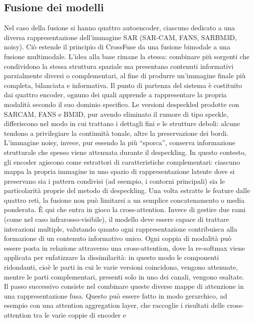 \subsection{Fusione dei modelli}
Nel caso della fusione si hanno quattro autoencoder, ciascuno dedicato a una diversa rappresentazione dell’immagine SAR (SAR-CAM, FANS, SARBM3D, noisy).
Ciò estende il principio di CrossFuse da una fusione bimodale a una 
fusione multimodale. L’idea alla base rimane la stessa: combinare più sorgenti che condividono la stessa struttura spaziale ma presentano contenuti 
informativi parzialmente diversi o complementari, al fine di produrre un’immagine finale più completa, bilanciata e informativa.
Il punto di partenza del sistema è costituito dai quattro encoder, ognuno dei quali apprende a rappresentare la propria modalità secondo il 
suo dominio specifico. Le versioni despeckled prodotte con SARCAM, FANS e BM3D, pur avendo eliminato il rumore di tipo speckle, differiscono 
nel modo in cui trattano i dettagli fini e le strutture deboli: alcune tendono a privilegiare la continuità tonale, altre la preservazione 
dei bordi. L’immagine noisy, invece, pur essendo la più “sporca”, conserva informazione strutturale che spesso viene attenuata durante 
il despeckling. In questo contesto, gli encoder agiscono come estrattori di caratteristiche complementari: ciascuno mappa la propria immagine 
in uno spazio di rappresentazione latente dove si preservano sia i pattern condivisi (ad esempio, i contorni principali) sia le particolarità 
proprie del metodo di despeckling.
Una volta estratte le feature dalle quattro reti, la fusione non può limitarsi a un semplice concatenamento o media ponderata. È qui che 
entra in gioco la cross-attention. Invece di gestire due 
rami (come nel caso infrarosso-visibile), il modello deve essere capace di trattare interazioni multiple, valutando quanto ogni rappresentazione 
contribuisca alla formazione di un contenuto informativo unico. Ogni coppia di modalità può essere posta in relazione attraverso una cross-attention, 
dove la re-softmax viene applicata per enfatizzare la dissimilarità: in questo modo le componenti ridondanti, cioè le parti in cui le 
varie versioni coincidono, vengono attenuate, mentre le parti complementari, presenti solo in uno dei canali, vengono esaltate.
Il passo successivo consiste nel combinare queste diverse mappe di attenzione in una rappresentazione fusa. Questo può essere fatto in modo 
gerarchico, ad esempio con una attention aggregation layer, che raccoglie i risultati delle cross-attention tra le varie coppie di encoder e 
